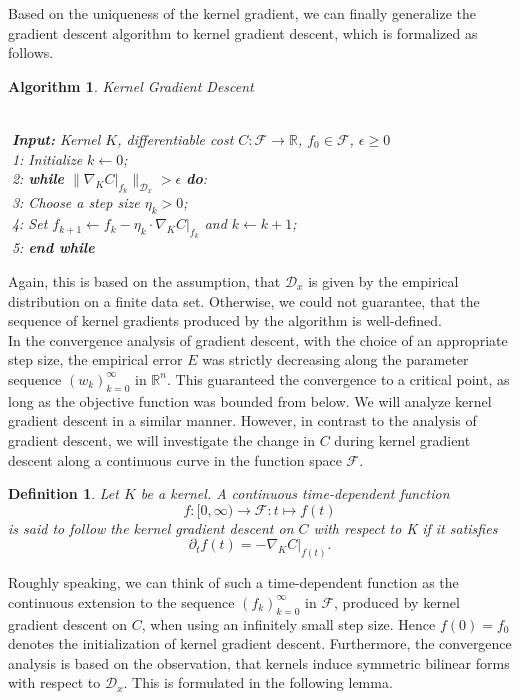 \documentclass[11pt, a4paper]{article}
\newtheorem{definition}[theorem]{Definition}
\newtheorem{algorithm}[theorem]{Algorithm}
\newcommand{\R}{\mathbb{R}}
\newcommand{\D}{\mathcal{D}}
\newcommand{\F}{\mathcal{F}}
\begin{document}
Based on the uniqueness of the kernel gradient, we can finally generalize the gradient descent algorithm to kernel gradient descent, which is formalized as follows.

\begin{algorithm}
\caption{Kernel Gradient Descent \textcolor{white}{$\Big |$}} \ \\
\textcolor{white}{$\Big |$}\textbf{Input:} Kernel $K$, differentiable cost $C: \F \to \R$, $f_0 \in \F$, $\epsilon \geq 0$ \\
\textcolor{white}{$\Big |$}1: Initialize $k \leftarrow 0$; \\
\textcolor{white}{$\Big |$}2: \textbf{while} $\big \| \nabla_K C |_{f_k} \big \|_{\D_x} > \epsilon$ \textbf{do}: \\
\textcolor{white}{$\Big |$}3: \quad Choose a step size $\eta_k > 0$; \\
\textcolor{white}{$\Big |$}4: \quad Set $f_{k+1} \leftarrow f_k - \eta_k \cdot \nabla_ K C |_{f_k}$ and $k \leftarrow k+1$; \\
\textcolor{white}{$\Big |$}5: \textbf{end while}
\end {algorithm}

Again, this is based on the assumption, that  $\D_x$ is given by the empirical distribution on a finite data set. Otherwise, we could not guarantee, that the sequence of kernel gradients produced by the algorithm is well-defined. \\

In the convergence analysis of gradient descent, with the choice of an appropriate step size, the empirical error $E$ was strictly decreasing along the parameter sequence $(w_k)_{k=0}^\infty$ in $\R^n$. This guaranteed the convergence to a critical point, as long as the objective function was bounded from below. We will analyze kernel gradient descent in a similar manner. However, in contrast to the analysis of gradient descent, we will investigate the change in $C$ during kernel gradient descent along a continuous curve in the function space $\F$. 

\begin{definition}
Let $K$ be a kernel. A continuous time-dependent function 
\[ f : [0, \infty) \to \F : t \mapsto f(t) \]
is said to follow the kernel gradient descent on $C$ with respect to K if it satisfies
\[ \partial_tf(t) = - \nabla_KC|_{f(t)}. \]
\end{definition}

Roughly speaking, we can think of such a time-dependent function as the continuous extension to the sequence $(f_k)_{k=0}^\infty$ in $\F$, produced by kernel gradient descent on $C$, when using an infinitely small step size. Hence $f(0) = f_0$ denotes the initialization of kernel gradient descent. Furthermore, the convergence analysis is based on the observation, that kernels induce symmetric bilinear forms with respect to $\D_x$. This is formulated in the following lemma.
\end{document}
